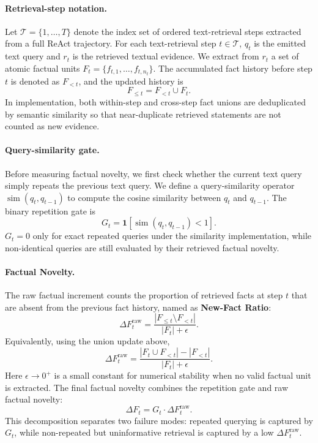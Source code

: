 \documentclass{article} %
\newcommand{\df}{\Delta F}
\newcommand{\query}{q}
\newcommand{\facts}{F}
\begin{document}
\paragraph{Retrieval-step notation.}
Let $\mathcal{T}=\{1,\ldots,T\}$ denote the index set of ordered text-retrieval steps extracted from a full ReAct trajectory.
For each text-retrieval step $t\in\mathcal{T}$, $\query_t$ is the emitted text query and $r_t$ is the retrieved textual evidence.
We extract from $r_t$ a set of atomic factual units $\facts_t=\{f_{t,1},\ldots,f_{t,n_t}\}$.
The accumulated fact history before step $t$ is denoted as $\facts_{<t}$, and the updated history is
\begin{equation}
    \facts_{\leq t} = \facts_{<t} \cup \facts_t.
\end{equation}
In implementation, both within-step and cross-step fact unions are deduplicated by semantic similarity so that near-duplicate retrieved statements are not counted as new evidence.

\paragraph{Query-similarity gate.}
Before measuring factual novelty, we first check whether the current text query simply repeats the previous text query.
We define a query-similarity operator$\operatorname{sim}(\query_t,\query_{t-1})$ to compute the cosine similarity between $q_t$ and $q_{t-1}$. The binary repetition gate is
\begin{equation}
    G_t = \mathbf{1}\!\left[\operatorname{sim}(\query_t,\query_{t-1}) < 1\right].
\end{equation}
$G_t=0$ only for exact repeated queries under the similarity implementation, while non-identical queries are still evaluated by their retrieved factual novelty.

\paragraph{Factual Novelty.}
The raw factual increment counts the proportion of retrieved facts at step $t$ that are absent from the previous fact history, named as \textbf{New-Fact Ratio}:
\begin{equation}
    \Delta F_t^{\mathrm{raw}}
    =
    \frac{|\facts_{\leq t} \setminus \facts_{<t}|}{|\facts_t|+\epsilon}.
\end{equation}
Equivalently, using the union update above,
\begin{equation}
    \Delta F_t^{\mathrm{raw}}
    =
    \frac{|\facts_t \cup \facts_{<t}| - |\facts_{<t}|}{|\facts_t|+\epsilon}.
    \label{eq:delta_f}
\end{equation}
Here $\epsilon\rightarrow0^+$ is a small constant for numerical stability when no valid factual unit is extracted.
The final factual novelty combines the repetition gate and raw factual novelty:
\begin{equation}
    \df_t = G_t \cdot \Delta F_t^{\mathrm{raw}}.
    \label{eq:delta_f_whole}
\end{equation}
This decomposition separates two failure modes: repeated querying is captured by $G_t$, while non-repeated but uninformative retrieval is captured by a low $\Delta F_t^{\mathrm{raw}}$.
\end{document}

